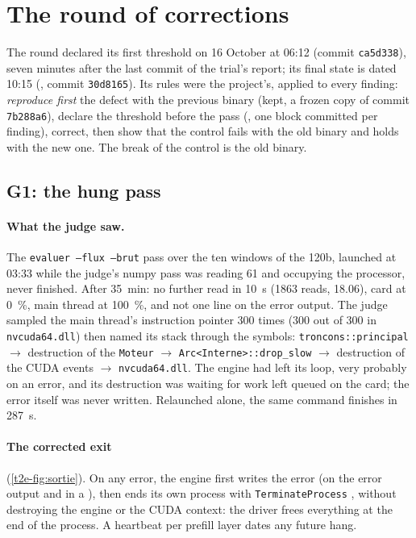\section{The round of corrections}\label{t2e-sec:ronde}

The round declared its first threshold on 16 October at 06:12 (commit \texttt{ca5d338}), seven minutes after the last commit of the trial's report; its final state is dated 10:15 (, commit \texttt{30d8165}). Its rules were the project's, applied to every finding: \emph{reproduce first} the defect with the previous binary (kept, a frozen copy of commit \texttt{7b288a6}), declare the threshold before the pass (, one block committed per finding), correct, then show that the control fails with the old binary and holds with the new one. The break of the control is the old binary.

\subsection{G1: the hung pass}\label{t2e-sec:g1}

\paragraph{What the judge saw.} The \texttt{evaluer --flux --brut} pass over the ten windows of the 120b, launched at 03:33 while the judge's numpy pass was reading \SI{61}{\Go} and occupying the processor, never finished. After \SI{35}{\minute}: no further read in \SI{10}{\second} (\num{1863} reads, \SI{18.06}{\Go}), card at \SI{0}{\percent}, main thread at \SI{100}{\percent}, and not one line on the error output. The judge sampled the main thread's instruction pointer 300 times (300 out of 300 in \texttt{nvcuda64.dll}) then named its stack through the symbols: \texttt{troncons::principal} $\to$ destruction of the \texttt{Moteur} $\to$ \texttt{Arc<Interne>::drop\_slow} $\to$ destruction of the CUDA events $\to$ \texttt{nvcuda64.dll}. The engine had left its loop, very probably on an error, and its destruction was waiting for work left queued on the card; the error itself was never written. Relaunched alone, the same command finishes in \SI{287}{\second}.

\paragraph{The corrected exit} (\cref{t2e-fig:sortie}). On any error, the engine first writes the error (on the error output and in a ), then ends its own process with \texttt{TerminateProcess} \cite{ms-terminateprocess}, without destroying the engine or the CUDA context: the driver frees everything at the end of the process. A heartbeat per prefill layer dates any future hang.

